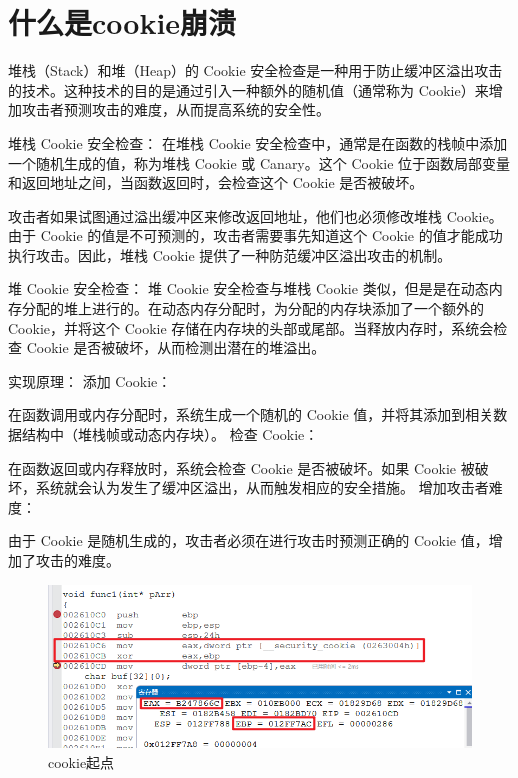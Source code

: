 \documentclass[AutoFakeBold,AutoFakeSlant]{beamer}
\begin{document}
	\section{什么是cookie崩溃}
	\begin{frame}[fragile]
		\tiny
		\linespread{1.6} \selectfont
		堆栈（Stack）和堆（Heap）的 Cookie 安全检查是一种用于防止缓冲区溢出攻击的技术。这种技术的目的是通过引入一种额外的随机值（通常称为 Cookie）来增加攻击者预测攻击的难度，从而提高系统的安全性。
		
		堆栈 Cookie 安全检查：
		在堆栈 Cookie 安全检查中，通常是在函数的栈帧中添加一个随机生成的值，称为堆栈 Cookie 或 Canary。这个 Cookie 位于函数局部变量和返回地址之间，当函数返回时，会检查这个 Cookie 是否被破坏。
		
		攻击者如果试图通过溢出缓冲区来修改返回地址，他们也必须修改堆栈 Cookie。由于 Cookie 的值是不可预测的，攻击者需要事先知道这个 Cookie 的值才能成功执行攻击。因此，堆栈 Cookie 提供了一种防范缓冲区溢出攻击的机制。
		
		堆 Cookie 安全检查：
		堆 Cookie 安全检查与堆栈 Cookie 类似，但是是在动态内存分配的堆上进行的。在动态内存分配时，为分配的内存块添加了一个额外的 Cookie，并将这个 Cookie 存储在内存块的头部或尾部。当释放内存时，系统会检查 Cookie 是否被破坏，从而检测出潜在的堆溢出。
		
		实现原理：
		添加 Cookie：
		
		在函数调用或内存分配时，系统生成一个随机的 Cookie 值，并将其添加到相关数据结构中（堆栈帧或动态内存块）。
		检查 Cookie：
		
		在函数返回或内存释放时，系统会检查 Cookie 是否被破坏。如果 Cookie 被破坏，系统就会认为发生了缓冲区溢出，从而触发相应的安全措施。
		增加攻击者难度：
		
		由于 Cookie 是随机生成的，攻击者必须在进行攻击时预测正确的 Cookie 值，增加了攻击的难度。
		
	\end{frame}
	
	\begin{frame} 
		\normalsize
		\begin{figure}
			\centering %
			\includegraphics[width=\linewidth]{1211cookie01}
			\caption{cookie起点}
			\label{fig:cookie01}
		\end{figure}
	\end{frame}
	
\end{document}
